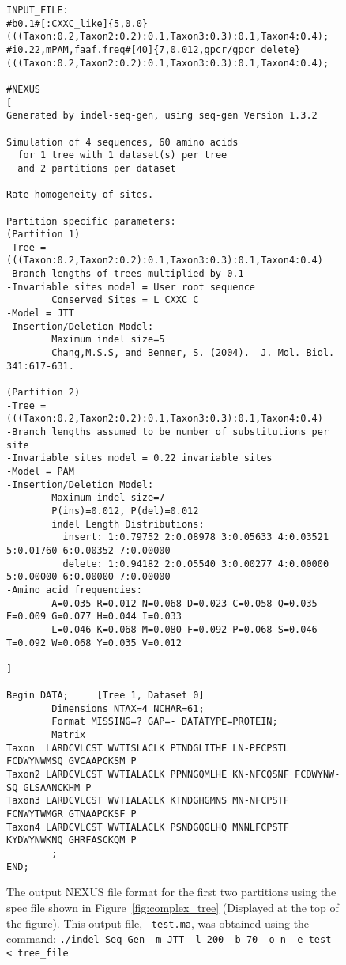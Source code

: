 \documentclass[10pt]{article}
\begin{document}
\begin{figure}
\footnotesize{
\begin{verbatim}
INPUT_FILE:
#b0.1#[:CXXC_like]{5,0.0}(((Taxon:0.2,Taxon2:0.2):0.1,Taxon3:0.3):0.1,Taxon4:0.4);
#i0.22,mPAM,faaf.freq#[40]{7,0.012,gpcr/gpcr_delete}(((Taxon:0.2,Taxon2:0.2):0.1,Taxon3:0.3):0.1,Taxon4:0.4);

#NEXUS
[
Generated by indel-seq-gen, using seq-gen Version 1.3.2

Simulation of 4 sequences, 60 amino acids
  for 1 tree with 1 dataset(s) per tree
  and 2 partitions per dataset

Rate homogeneity of sites.

Partition specific parameters:
(Partition 1)
-Tree = (((Taxon:0.2,Taxon2:0.2):0.1,Taxon3:0.3):0.1,Taxon4:0.4)
-Branch lengths of trees multiplied by 0.1
-Invariable sites model = User root sequence
        Conserved Sites = L CXXC C
-Model = JTT
-Insertion/Deletion Model:
        Maximum indel size=5
        Chang,M.S.S, and Benner, S. (2004).  J. Mol. Biol. 341:617-631.

(Partition 2)
-Tree = (((Taxon:0.2,Taxon2:0.2):0.1,Taxon3:0.3):0.1,Taxon4:0.4)
-Branch lengths assumed to be number of substitutions per site
-Invariable sites model = 0.22 invariable sites
-Model = PAM
-Insertion/Deletion Model:
        Maximum indel size=7
        P(ins)=0.012, P(del)=0.012
        indel Length Distributions:
          insert: 1:0.79752 2:0.08978 3:0.05633 4:0.03521 5:0.01760 6:0.00352 7:0.00000
          delete: 1:0.94182 2:0.05540 3:0.00277 4:0.00000 5:0.00000 6:0.00000 7:0.00000
-Amino acid frequencies:
        A=0.035 R=0.012 N=0.068 D=0.023 C=0.058 Q=0.035 E=0.009 G=0.077 H=0.044 I=0.033
        L=0.046 K=0.068 M=0.080 F=0.092 P=0.068 S=0.046 T=0.092 W=0.068 Y=0.035 V=0.012

]

Begin DATA;     [Tree 1, Dataset 0]
        Dimensions NTAX=4 NCHAR=61;
        Format MISSING=? GAP=- DATATYPE=PROTEIN;
        Matrix
Taxon  LARDCVLCST WVTISLACLK PTNDGLITHE LN-PFCPSTL FCDWYNWMSQ GVCAAPCKSM P
Taxon2 LARDCVLCST WVTIALACLK PPNNGQMLHE KN-NFCQSNF FCDWYNW-SQ GLSAANCKHM P
Taxon3 LARDCVLCST WVTIALACLK KTNDGHGMNS MN-NFCPSTF FCNWYTWMGR GTNAAPCKSF P
Taxon4 LARDCVLCST WVTIALACLK PSNDGQGLHQ MNNLFCPSTF KYDWYNWKNQ GHRFASCKQM P
        ;
END;
\end{verbatim}
}
\caption{The output NEXUS file format for the first two partitions using the spec file shown
in Figure~\ref{fig:complex_tree} (Displayed at the top of the figure).  This output file, {\tt
test.ma}, was obtained using the command:
{\tt ./indel-Seq-Gen -m JTT -l 200 -b 70 -o n -e test < tree\_file}}
\label{fig:NEX}
\end{figure}
\end{document}
